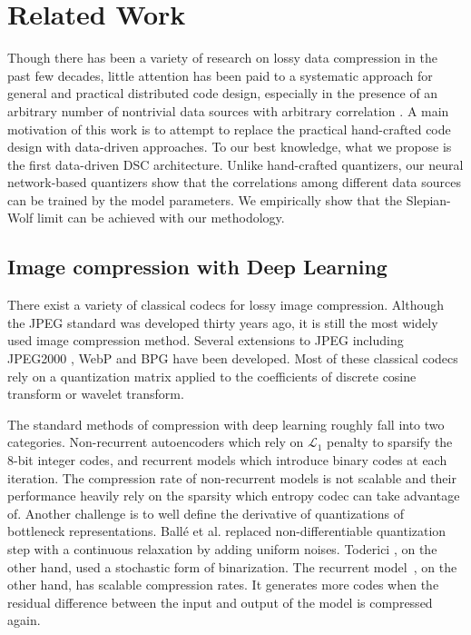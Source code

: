 \documentclass[10pt,twocolumn,letterpaper]{article}
\begin{document}
\section{Related Work}
Though there has been a variety of research on lossy data compression in the past few decades, little attention has been paid to a systematic approach for general and practical distributed code design, especially in the presence of an arbitrary number of nontrivial data sources with arbitrary correlation %
\cite{xiong2004distributed}. 
A main motivation of this work is to attempt to replace the practical hand-crafted code design with data-driven approaches. 
To our best knowledge, what we propose is the first data-driven DSC architecture. 
Unlike hand-crafted quantizers, our neural network-based quantizers show that the correlations among different data sources can be trained by the model parameters. We empirically show that the Slepian-Wolf limit can be achieved with our methodology. 

\subsection{Image compression with Deep Learning}
There exist a variety of classical codecs for lossy image compression. Although the JPEG standard \cite{wallace1992jpeg} was developed thirty years ago, it is still the most widely used image compression method. Several extensions to JPEG including JPEG2000 \cite{skodras2001jpeg}, WebP \cite{google2010webp} and BPG \cite{bellard2014bpg} have been developed. Most of these classical codecs rely on a quantization matrix applied to the coefficients of discrete cosine transform or wavelet transform.

The standard methods of compression with deep learning roughly fall into two categories. Non-recurrent autoencoders which rely on $\mathcal{L}_1$ penalty to sparsify the 8-bit integer codes, and recurrent models which introduce binary codes at each iteration. 
The compression rate of non-recurrent models is not scalable and their performance heavily rely on the sparsity which entropy codec can take advantage of. 
Another challenge is to well define the derivative of quantizations of bottleneck representations. Ball\'e et al. \cite{balle2016end} replaced non-differentiable quantization step with a continuous relaxation by adding uniform noises. Toderici \cite{toderici2015variable}, on the other hand, used a stochastic form of binarization. 
The recurrent model~\cite{toderici2015variable,johnston2017improved}, on the other hand, has scalable compression rates. It generates more codes when the residual difference between the input and output of the model is compressed again.
\end{document}
